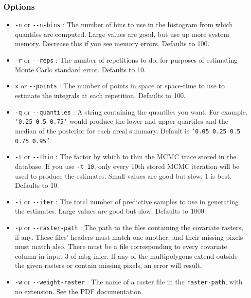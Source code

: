 \subsubsection{Options%
}
%
\begin{itemize}

\item \texttt{-n} or \texttt{-{}-n-bins} : The number of bins to use in the histogram from which quantiles
are computed. Large values are good, but use up more system memory. Decrease this if you
see memory errors. Defaults to 100.

\item \texttt{-r} or \texttt{-{}-reps} : The number of repetitions to do, for purposes of estimating Monte
Carlo standard error. Defaults to 10.

\item \texttt{x} or \texttt{-{}-points} : The number of points in space or space-time to use to estimate the
integrals at each repetition. Defaults to 100.

\item \texttt{-q} or \texttt{-{}-quantiles} : A string containing the quantiles you want. For example,
\texttt{'0.25 0.5 0.75'} would produce the lower and upper quartiles and the median of the
posterior for each areal summary. Default is \texttt{'0.05 0.25 0.5 0.75 0.95'}.

\item \texttt{-t} or \texttt{-{}-thin} : The factor by which to thin the MCMC trace stored in the database.
If you use \texttt{-t 10}, only every 10th stored MCMC iteration will be used to produce the
estimates. Small values are good but slow. 1 is best. Defaults to 10.

\item \texttt{-i} or \texttt{-{}-iter} : The total number of predictive samples to use in generating the
estimates. Large values are good but slow. Defaults to 1000.

\item \texttt{-p} or \texttt{-{}-raster-path} : The path to the files containing the covariate rasters, if any.
These files' headers must match one another, and their missing pixels must match also. There
must be a file corresponding to every covariate column in input 3 of mbg-infer. If any of the
multipolygons extend outside the given rasters or contain missing pixels, an error will result.

\item \texttt{-w} or \texttt{-{}-weight-raster} : The name of a raster file in the \texttt{raster-path}, with no
extension. See the PDF documentation.

\end{itemize}

